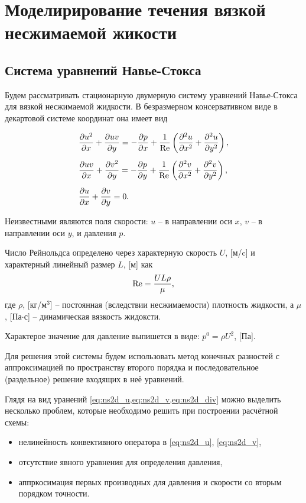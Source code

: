 \section{Моделирирование течения вязкой несжимаемой жикости}
\subsection{Система уравнений Навье-Стокса}

Будем рассматривать стационарную двумерную систему уравнений
Навье-Стокса для вязкой несжимаемой жидкости.
В безразмерном консервативном виде в декартовой системе координат она имеет вид

\begin{align}
    \label{eq:ns2d_u}
    & \frac{\partial u^2}{\partial x} + \frac{\partial uv}{\partial y} =
        -\frac{\partial p}{\partial x}
        + \frac{1}{\mathrm{Re}}\left(\frac{\partial^2 u}{\partial x^2} + \frac{\partial^2 u}{\partial y^2}\right),\\[5pt]
    \label{eq:ns2d_v}
    & \frac{\partial uv}{\partial x} + \frac{\partial v^2}{\partial y} =
        -\frac{\partial p}{\partial y}
        + \frac{1}{\mathrm{Re}}\left(\frac{\partial^2 v}{\partial x^2} + \frac{\partial^2 v}{\partial y^2}\right), \\[5pt]
    \label{eq:ns2d_div}
    &\frac{\partial u}{\partial x} + \frac{\partial v}{\partial y} = 0.
\end{align}

Неизвестными являются поля скорости: $u$ -- в направлении оси $x$,
$v$ -- в направлении оси $y$, и давления $p$.

Число Рейнольдса определено через характерную скорость $U$, [м/c] и
характерный линейный размер $L$, [м] как
\begin{equation*}
    \mathrm{Re} = \frac{UL\rho}{\mu},
\end{equation*}
где $\rho$, [кг/м$^3$] -- постоянная (вследствии несжимаемости) плотность жидкости, а
$\mu$, [Па$\cdot$с] -- динамическая вязкость жидоксти.

Характерое значение для давление выпишется в виде:
$ p^0 = \rho U^2 $, [Па].

Для решения этой системы будем использовать метод конечных разностей
с аппроксимацией по пространству второго порядка и последовательное (раздельное) решение входящих в неё
уравнений.

Глядя на вид уранений \cref{eq:ns2d_u,eq:ns2d_v,eq:ns2d_div}
можно выделить несколько проблем, которые необходимо решить
при построении расчётной схемы:
\begin{itemize}
\item нелинейность конвективного оператора в \eqref{eq:ns2d_u}, \eqref{eq:ns2d_v},
\item отсутствие явного уравнения для определения давления,
\item аппркосимация первых производных для давления и скорости со вторым порядком точности.
\end{itemize}


